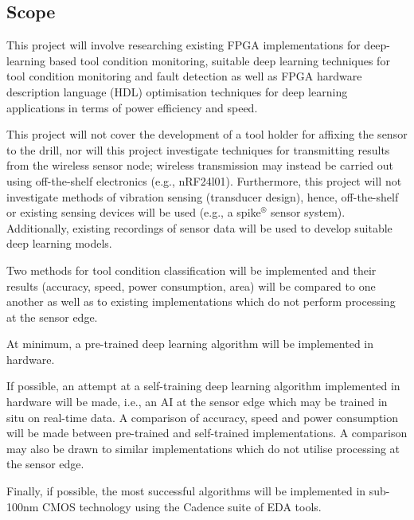 \documentclass{article}
\begin{document}

\subsection{Scope}
This project will involve researching existing FPGA implementations for deep-learning based tool condition monitoring, suitable deep learning techniques for tool condition monitoring and fault detection as well as FPGA hardware description language (HDL) optimisation techniques for deep learning applications in terms of power efficiency and speed.

 
This project will not cover the development of a tool holder for affixing the sensor to the drill, nor will this project investigate techniques for transmitting results from the wireless sensor node; wireless transmission may instead be carried out using off-the-shelf electronics (e.g., nRF24l01). Furthermore, this project will not investigate methods of vibration sensing (transducer design), hence, off-the-shelf or existing sensing devices will be used (e.g., a spike$^{\circledR}$ sensor system). Additionally, existing recordings of sensor data will be used to develop suitable deep learning models.


Two methods for tool condition classification will be implemented and their results (accuracy, speed, power consumption, area) will be compared to one another as well as to existing implementations which do not perform processing at the sensor edge. 


At minimum, a pre-trained deep learning algorithm will be implemented in hardware.

If possible, an attempt at a self-training deep learning algorithm implemented in hardware will be made, i.e., an AI at the sensor edge which may be trained in situ on real-time data. A comparison of accuracy, speed and power consumption will be made between pre-trained and self-trained implementations. A comparison may also be drawn to similar implementations which do not utilise processing at the sensor edge.

Finally, if possible, the most successful algorithms will be implemented in sub-100nm CMOS technology using the Cadence suite of EDA tools.
\end{document}
